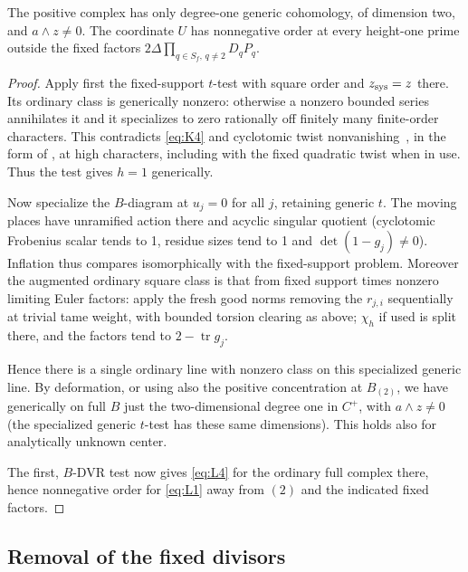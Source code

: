 \begin{corollary}\label{cor:positive-determinant:generic}
The positive complex has only degree-one generic cohomology, of dimension
two, and \(a\wedge z\ne0\). The coordinate \(U\) has nonnegative order at
every height-one prime outside the fixed factors
\(2\Delta\prod_{q\in S_f,\,q\ne2}D_qP_q\).
\end{corollary}
\begin{proof}

Apply first the fixed-support \(t\)-test with square order and \(z_{\rm sys}=z\) there. Its ordinary class is generically nonzero: otherwise a nonzero bounded series annihilates it and it specializes to zero rationally off finitely many finite-order characters. This contradicts \eqref{eq:K4} and cyclotomic twist nonvanishing~\cite{Rohrlich88}, in the form of \cite[Theorem~13.5(2)]{Kato04}, at high characters, including with the fixed quadratic twist when in use. Thus the test gives \(h=1\) generically. 

Now specialize the \(B\)-diagram at \(u_j=0\) for all \(j\), retaining generic \(t\). The moving places have unramified action there and acyclic singular quotient (cyclotomic Frobenius scalar tends to 1, residue sizes tend to 1 and \(\det(1-g_j)\ne0\)). Inflation thus compares isomorphically with the fixed-support problem. Moreover the augmented ordinary square class is that from fixed support times nonzero limiting Euler factors: apply the fresh good norms removing the \(r_{j,i}\) sequentially at trivial tame weight, with bounded torsion clearing as above; \(\chi_h\) if used is split there, and the factors tend to \(2-\operatorname{tr}g_j\). 

Hence there is a single ordinary line with nonzero class on this specialized generic line. By deformation, or using also the positive concentration at \(B_{(2)}\), we have generically on full \(B\) just the two-dimensional degree one in \(C^+\), with \(a\wedge z\ne0\) (the specialized generic \(t\)-test has these same dimensions). This holds also for analytically unknown center. 

The first, \(B\)-DVR test now gives \eqref{eq:L4} for the ordinary full complex there, hence nonnegative order for \eqref{eq:L1} away from \((2)\) and the indicated fixed factors.
\end{proof}

\subsection{Removal of the fixed divisors}\label{subsec:positive-determinant:division}

